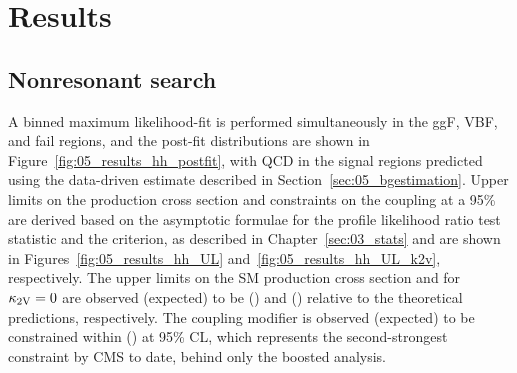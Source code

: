 


\section{Results}
\label{sec:05_results}

\subsection{Nonresonant \texorpdfstring{\HH}{HH} search}
\label{sec:05_results_hh}

A binned maximum likelihood-fit is performed simultaneously in the ggF, VBF, and fail regions, and the post-fit distributions are shown in Figure~\ref{fig:05_results_hh_postfit}, with QCD in the signal regions predicted using the data-driven estimate described in Section~\ref{sec:05_bgestimation}.
Upper limits on the \HH production cross section and constraints on the \kapvv coupling at a 95\% \CL are derived based on the asymptotic formulae for the profile likelihood ratio test statistic and the \CLs criterion, as described in Chapter~\ref{sec:03_stats} and are shown in Figures~\ref{fig:05_results_hh_UL} and~\ref{fig:05_results_hh_UL_k2v}, respectively.
The upper limits on the SM \HH production cross section and for $\kappa_{2\textrm{V}}=0$ are observed (expected) to be \hhobs (\hhexp) and \cvvobs (\cvvexp) relative to the theoretical predictions, respectively.
The coupling modifier \kapvv is observed (expected) to be constrained within \kvvobslims (\kvvexplims) at 95\% CL, which represents the second-strongest constraint by CMS to date, behind only the boosted \bbbb analysis.

